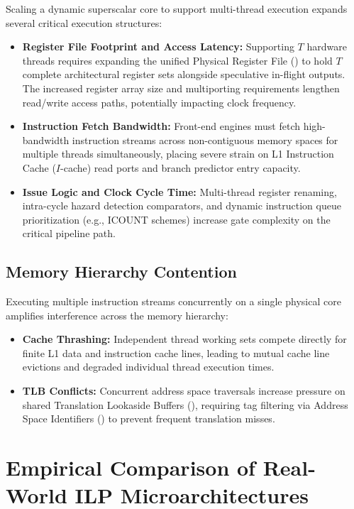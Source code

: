 Scaling a dynamic superscalar core to support multi-thread execution expands several critical execution structures:
\begin{itemize}
    \item \textbf{Register File Footprint and Access Latency:} Supporting $T$ hardware threads requires expanding the unified Physical Register File () to hold $T$ complete architectural register sets alongside speculative in-flight outputs. The increased register array size and multiporting requirements lengthen read/write access paths, potentially impacting clock frequency.
    \item \textbf{Instruction Fetch Bandwidth:} Front-end engines must fetch high-bandwidth instruction streams across non-contiguous memory spaces for multiple threads simultaneously, placing severe strain on L1 Instruction Cache ($I$-cache) read ports and branch predictor entry capacity.
    \item \textbf{Issue Logic and Clock Cycle Time:} Multi-thread register renaming, intra-cycle hazard detection comparators, and dynamic instruction queue prioritization (e.g., \textsf{ICOUNT} schemes) increase gate complexity on the critical pipeline path.
\end{itemize}

\subsection{Memory Hierarchy Contention}

Executing multiple instruction streams concurrently on a single physical core amplifies interference across the memory hierarchy:
\begin{itemize}
    \item \textbf{Cache Thrashing:} Independent thread working sets compete directly for finite L1 data and instruction cache lines, leading to mutual cache line evictions and degraded individual thread execution times.
    \item \textbf{TLB Conflicts:} Concurrent address space traversals increase pressure on shared Translation Lookaside Buffers (), requiring tag filtering via Address Space Identifiers () to prevent frequent translation misses.
\end{itemize}

\section{Empirical Comparison of Real-World ILP Microarchitectures}
\label{sec:empirical_ilp_microarchitectures}

